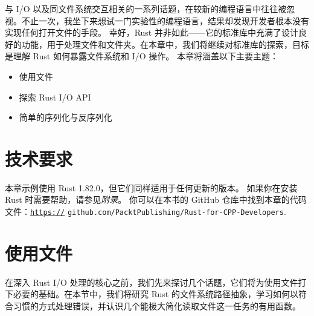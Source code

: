 与 I/\allowbreak{}O 以及同文件系统交互相关的一系列话题，在较新的编程语言中往往被忽视。不止一次，我坐下来想试一门实验性的编程语言，结果却发现开发者根本没有实现任何打开文件的手段。
幸好，Rust 并非如此——它的标准库中充满了设计良好的功能，用于处理文件和文件夹。在本章中，我们将继续对标准库的探索，目标是理解 Rust 如何暴露文件系统和 I/\allowbreak{}O 操作。
本章将涵盖以下主要主题：
\begin{itemize}
  \item 使用文件
  \item 探索 Rust I/\allowbreak{}O API
  \item 简单的序列化与反序列化
\end{itemize}
\section{技术要求}
本章示例使用 Rust 1.\allowbreak{}82.\allowbreak{}0，但它们同样适用于任何更新的版本。
如果你在安装 Rust 时需要帮助，请参见\emph{附录}。
你可以在本书的 GitHub 仓库中找到本章的代码文件：\href{https://}{\texttt{https://}}
\texttt{github.\allowbreak{}com/\allowbreak{}PacktPublishing/\allowbreak{}Rust-\allowbreak{}for-\allowbreak{}CPP-\allowbreak{}Developers}.
\section{使用文件}
\label{idx:idx_5c13fba5}
在深入 Rust I/\allowbreak{}O 处理的核心之前，我们先来探讨几个话题，它们将为使用文件打下必要的基础。在本节中，我们将研究 Rust 的文件系统路径抽象，学习如何以符合习惯的方式处理错误，并认识几个能极大简化读取文件这一任务的有用函数。
